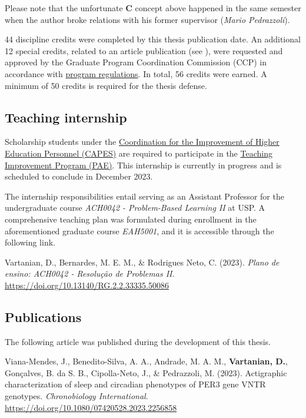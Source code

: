 \documentclass[
12pt,
openright,
oneside,
a4paper,
chapter=TITLE,
section=TITLE,
french,
spanish,
brazil,
english
]{abntex2}\usepackage{array}
\begin{document}
Please note that the unfortunate \textbf{C} concept above happened in
the same semester when the author broke relations with his former
supervisor (\emph{Mario Pedrazzoli}).

44 discipline credits were completed by this thesis publication date. An
additional 12 special credits, related to an article publication (see
\textcite{viana-mendes2023}), were requested and approved by the
Graduate Program Coordination Commission (CCP) in accordance with
\href{https://leginf.usp.br/?resolucao=resolucao-copgr-no-7829-de-03-de-outubro-de-2019}{program
regulations}. In total, 56 credits were earned. A minimum of 50 credits
is required for the thesis defense.

\subsection{Teaching internship}\label{teaching-internship}

Scholarship students under the
\href{https://www.gov.br/capes/}{Coordination for the Improvement of
Higher Education Personnel (CAPES)} are required to participate in the
\href{www5.each.usp.br/pae/}{Teaching Improvement Program (PAE)}. This
internship is currently in progress and is scheduled to conclude in
December 2023.

The internship responsibilities entail serving as an Assistant Professor
for the undergraduate course \emph{ACH0042 - Problem-Based Learning II}
at USP. A comprehensive teaching plan \autocite{vartanian2023e} was
formulated during enrollment in the aforementioned graduate course
\emph{EAH5001}, and it is accessible through the following link.

\smallskip

\noindent Vartanian, D., Bernardes, M. E. M., \& Rodrigues Neto, C.
(2023). \emph{Plano de ensino: ACH0042 - Resolução de Problemas II}.
\url{https://doi.org/10.13140/RG.2.2.33335.50086}

\subsection{Publications}\label{publications}

The following article \autocite{viana-mendes2023} was published during
the development of this thesis.

\smallskip

\noindent Viana-Mendes, J., Benedito-Silva, A. A., Andrade, M. A. M.,
\textbf{Vartanian, D.}, Gonçalves, B. da S. B., Cipolla-Neto, J., \&
Pedrazzoli, M. (2023). Actigraphic characterization of sleep and
circadian phenotypes of PER3 gene VNTR genotypes. \emph{Chronobiology
International}. \url{https://doi.org/10.1080/07420528.2023.2256858}
\end{document}
